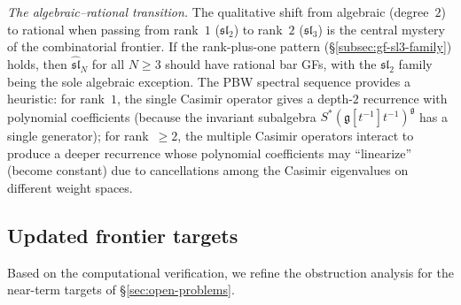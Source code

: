 \emph{The algebraic--rational transition.}
The qualitative shift from algebraic (degree~$2$) to rational when passing
from rank~$1$ ($\mathfrak{sl}_2$) to rank~$2$ ($\mathfrak{sl}_3$) is the
central mystery of the combinatorial frontier. If the rank-plus-one pattern
(\S\ref{subsec:gf-sl3-family}) holds, then $\widehat{\mathfrak{sl}}_N$
for all $N \geq 3$ should have rational bar GFs, with the $\mathfrak{sl}_2$
family being the sole algebraic exception. The PBW spectral sequence
provides a heuristic: for rank~$1$, the single Casimir operator gives
a depth-$2$ recurrence with polynomial coefficients (because the
invariant subalgebra $S^*(\mathfrak{g}[t^{-1}]t^{-1})^{\mathfrak{g}}$ has a
single generator); for rank~$\geq 2$, the multiple Casimir operators
interact to produce a deeper recurrence whose polynomial coefficients
may ``linearize'' (become constant) due to cancellations among the
Casimir eigenvalues on different weight spaces.

\subsection{Updated frontier targets}
\label{subsec:updated-frontier}

Based on the computational verification, we refine the obstruction analysis
for the near-term targets of \S\ref{sec:open-problems}.


